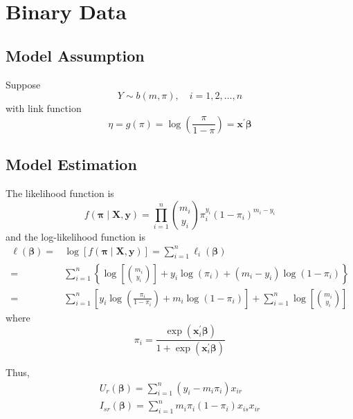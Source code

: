 \chapter{Binary Data}

\section{Model Assumption}

Suppose
\begin{equation}
    Y\sim b\left(m,\pi\right),\quad i=1,2,\ldots,n
\end{equation}
with link function
\begin{equation}
    \eta=g\left(\pi\right)=\log\left(\frac{\pi}{1-\pi}\right)=\mathbf{x}^{\prime}\boldsymbol{\beta}
\end{equation}
\begin{remark}
    
\end{remark}

\section{Model Estimation}

The likelihood function is
\begin{equation}
    f\left(\boldsymbol{\pi}\mid\mathbf{X},\mathbf{y}\right)=\prod_{i=1}^{n}\binom{m_{i}}{y_{i}}\pi_{i}^{y_{i}}\left(1-\pi_{i}\right)^{m_{i}-y_{i}}
\end{equation}
and the log-likelihood function is
\begin{equation}
    \begin{aligned}
        \ell\left(\boldsymbol{\beta}\right)= & \log\left[f\left(\boldsymbol{\pi}\mid\mathbf{X},\mathbf{y}\right)\right]=\sum_{i=1}^{n}\ell_{i}\left(\boldsymbol{\beta}\right)                                 \\
        =                                    & \sum_{i=1}^{n}\left\{\log\left[\binom{m_{i}}{y_{i}}\right]+y_{i}\log\left(\pi_{i}\right)+\left(m_{i}-y_{i}\right)\log\left(1-\pi_{i}\right)\right\}            \\
        =                                    & \sum_{i=1}^{n}\left[y_{i}\log\left(\frac{\pi_{i}}{1-\pi_{i}}\right)+m_{i}\log\left(1-\pi_{i}\right)\right]+\sum_{i=1}^{n}\log\left[\binom{m_{i}}{y_{i}}\right]
    \end{aligned}
\end{equation}
where
\begin{equation}
    \pi_{i}=\frac{\exp\left(\mathbf{x}_{i}^{\prime}\boldsymbol{\beta}\right)}{1+\exp\left(\mathbf{x}_{i}^{\prime}\boldsymbol{\beta}\right)}
\end{equation}

Thus,
\begin{gather*}
    U_{r}\left(\boldsymbol{\beta}\right)=\sum_{i=1}^{n}\left(y_{i}-m_{i}\pi_{i}\right)x_{ir} \\
    I_{sr}\left(\boldsymbol{\beta}\right)=\sum_{i=1}^{n}m_{i}\pi_{i}\left(1-\pi_{i}\right)x_{is}x_{ir}
\end{gather*}